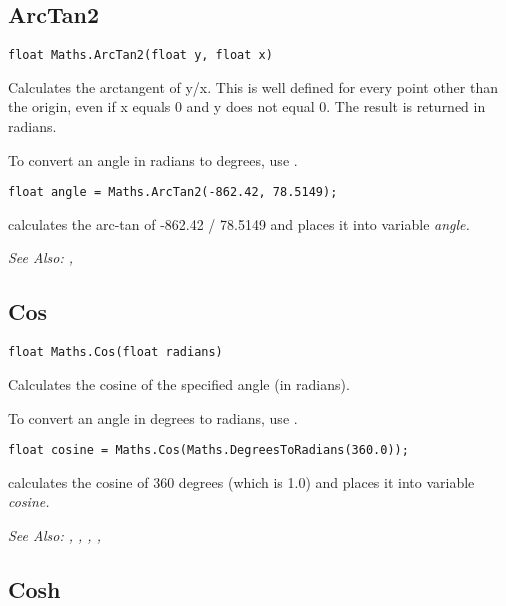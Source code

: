 \subsection{ArcTan2}\label{Maths.ArcTan2}%

\begin{verbatim}
float Maths.ArcTan2(float y, float x)
\end{verbatim}
Calculates the arctangent of y/x. This is well defined for every point other than the origin,
even if x equals 0 and y does not equal 0. The result is returned in radians.

To convert an angle in radians to degrees, use .

\begin{verbatim}
float angle = Maths.ArcTan2(-862.42, 78.5149);
\end{verbatim}
calculates the arc-tan of -862.42 / 78.5149 and places it into variable \it{angle}.

\it{See Also:} ,


\subsection{Cos}\label{Maths.Cos}%

\begin{verbatim}
float Maths.Cos(float radians)
\end{verbatim}
Calculates the cosine of the specified angle (in radians).

To convert an angle in degrees to radians, use .

\begin{verbatim}
float cosine = Maths.Cos(Maths.DegreesToRadians(360.0));
\end{verbatim}
calculates the cosine of 360 degrees (which is 1.0) and places it into variable \it{cosine}.

\it{See Also:} ,
, ,
, 


\subsection{Cosh}\label{Maths.Cosh}%

